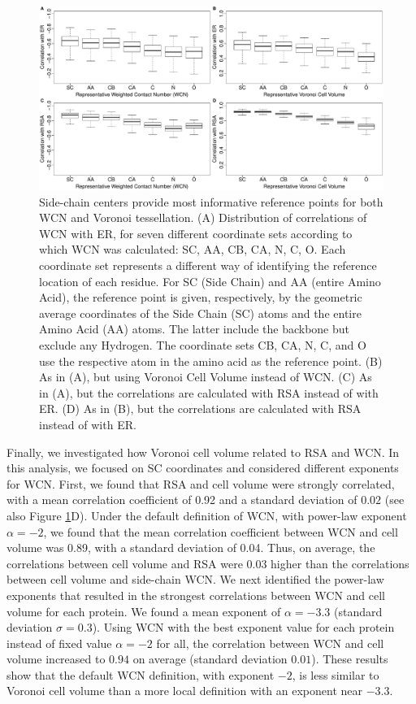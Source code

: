 \documentclass[12pt]{article}
\begin{document}
    \begin{figure}
        \begin{center}
            \includegraphics[width=6.5in]{best_wcn_vvol_boxplot.pdf}
        \end{center}
        \caption{Side-chain centers provide most informative reference points for both WCN and Voronoi tessellation. (A) Distribution of correlations of WCN with ER, for seven different coordinate sets according to which WCN was calculated: SC, AA, CB, CA, N, C, O. Each coordinate set represents a different way of identifying the reference location of each residue. For SC (Side Chain) and AA (entire Amino Acid), the reference point is given, respectively, by the geometric average coordinates of the Side Chain (SC) atoms and the entire Amino Acid (AA) atoms. The latter include the backbone but exclude any Hydrogen. The coordinate sets CB, CA, N, C, and O use the respective atom in the amino acid as the reference point. (B) As in (A), but using Voronoi Cell Volume instead of WCN. (C) As in (A), but the correlations are calculated with RSA instead of with ER. (D) As in (B), but the correlations are calculated with RSA instead of with ER.}
        \label{fig:best_wcn_vvol}
    \end{figure}

Finally, we investigated how Voronoi cell volume related to RSA and WCN. In this analysis, we focused on SC coordinates and considered different exponents for WCN. First, we found that RSA and cell volume were strongly correlated, with a mean correlation coefficient of 0.92 and a standard deviation of $0.02$ (see also Figure \ref{fig:best_wcn_vvol}D). Under the default definition of WCN, with power-law exponent $\alpha=-2$, we found that the mean correlation coefficient between WCN and cell volume was 0.89, with a standard deviation of 0.04. Thus, on average, the correlations between cell volume and RSA were 0.03 higher than the correlations between cell volume and side-chain WCN. We next identified the power-law exponents that resulted in the strongest correlations between WCN and cell volume for each protein. We found a mean exponent of $\alpha=-3.3$ (standard deviation $\sigma=0.3$). Using WCN with the best exponent value for each protein instead of fixed value $\alpha=-2$ for all, the correlation between WCN and cell volume increased to $0.94$ on average (standard deviation $0.01$). These results show that the default WCN definition, with exponent $-2$, is less similar to Voronoi cell volume than a more local definition with an exponent near $-3.3$.
\end{document}
